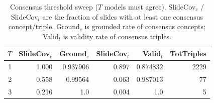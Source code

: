 \begin{table}[t]
\centering
\small
\begin{tabular}{rrrrrr}
\toprule
$T$ & SlideCov$_c$ & Ground$_c$ & SlideCov$_t$ & Valid$_t$ & TotTriples \\
\midrule
1 & 1.000 & 0.937906 & 0.897 & 0.874832 & 2229 \\
2 & 0.558 & 0.99564 & 0.063 & 0.987013 & 77 \\
3 & 0.216 & 1.0 & 0.004 & 1.0 & 5 \\
\bottomrule
\end{tabular}
\caption{Consensus threshold sweep ($T$ models must agree). SlideCov$_c$ / SlideCov$_t$ are the fraction of slides with at least one consensus concept/triple. Ground$_c$ is grounded rate of consensus concepts; Valid$_t$ is validity rate of consensus triples.}
\label{tab:sweep}
\end{table}
